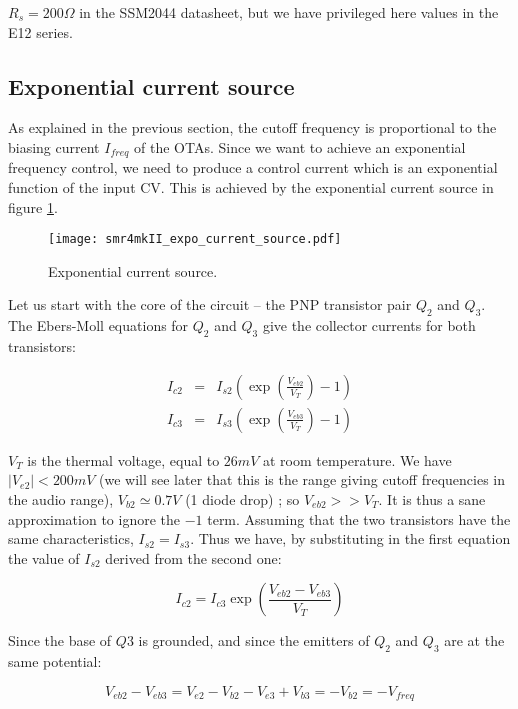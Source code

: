 \documentclass[a4paper,11pt]{article}
\begin{document}
$R_s = 200 \Omega$ in the SSM2044 datasheet, but we have privileged here values in the E12 series.

\subsection{Exponential current source}

As explained in the previous section, the cutoff frequency is proportional to the biasing current $I_{freq}$ of the OTAs. Since we want to achieve an exponential frequency control, we need to produce a control current which is an exponential function of the input CV. This is achieved by the exponential current source in figure \ref{fig:expo}.

\begin{figure}
\centering
\texttt{[image: smr4mkII\_expo\_current\_source.pdf]}
\caption{Exponential current source.}
\label{fig:expo}
\end{figure}

Let us start with the core of the circuit -- the PNP transistor pair $Q_2$ and $Q_3$. The Ebers-Moll equations for $Q_2$ and $Q_3$ give the collector currents for both transistors:

\begin{eqnarray}
I_{c2} &=& I_{s2} \left(\exp \left( \frac{V_{eb2}}{V_T} \right) - 1 \right) \\
I_{c3} &=& I_{s3} \left(\exp \left( \frac{V_{eb3}}{V_T} \right) - 1 \right)
\end{eqnarray}

$V_T$ is the thermal voltage, equal to $26 mV$ at room temperature. We have $|V_{e2}| < 200mV$ (we will see later that this is the range giving cutoff frequencies in the audio range), $V_{b2} \simeq 0.7V$ (1 diode drop) ; so $V_{eb2} >> V_T$. It is thus a sane approximation to ignore the $- 1$ term. Assuming that the two transistors have the same characteristics, $I_{s2} = I_{s3}$. Thus we have, by substituting in the first equation the value of $I_{s2}$ derived from the second one:

\begin{equation}
I_{c2} = I_{c3} \exp \left( \frac{V_{eb2} - V_{eb3}}{V_T} \right)
\end{equation}

Since the base of $Q3$ is grounded, and since the emitters of $Q_2$ and $Q_3$ are at the same potential:

\begin{equation}
V_{eb2} - V_{eb3} = V_{e2} - V_{b2} - V_{e3} + V_{b3} = -V_{b2} = -V_{freq}
\end{equation}
\end{document}
